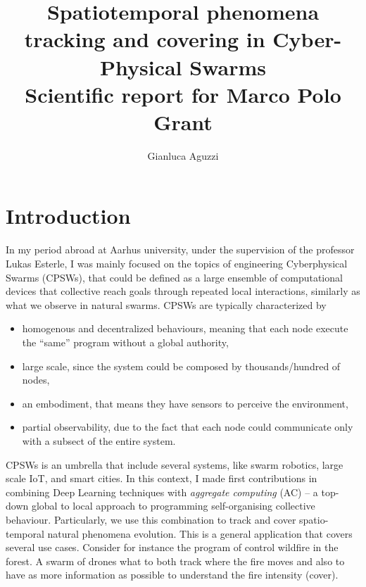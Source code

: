 \documentclass{article}
\title{
Spatiotemporal phenomena tracking and covering in Cyber-Physical Swarms \\[10pt]
\large Scientific report for Marco Polo Grant
}
\author{Gianluca Aguzzi
}
\begin{document}
\maketitle

\begin{abstract}

\end{abstract}

\section{Introduction}
In my period abroad at Aarhus university, under the supervision of the professor Lukas Esterle, 
 I was mainly focused on the topics of engineering Cyberphysical Swarms (CPSWs), that could be defined as a
 large ensemble of computational devices that collective reach goals through repeated local interactions, similarly as what we observe in natural swarms. 
CPSWs are typically characterized by 
\begin{itemize}
\item homogenous and decentralized behaviours, meaning that each node execute the ``same'' program without a global authority,
\item large scale, since the system could be composed by thousands/hundred of nodes, 
\item an embodiment, that means they have sensors to perceive the environment,
\item partial observability, due to the fact that each node could communicate only with a subsect of the entire system.
\end{itemize}
CPSWs is an umbrella that include several systems, like swarm robotics, large scale IoT, and smart cities.
%
In this context, I made first contributions in combining Deep Learning techniques with \textit{aggregate computing} (AC) 
 -- a top-down global to local approach to programming self-organising collective behaviour.
Particularly, we use this combination to track and cover spatio-temporal natural phenomena evolution. 
%
This is a general application that covers several use cases. 
 Consider for instance the program of control wildfire in the forest. 
 A swarm of drones what to both track where the fire moves and also to have as more information as possible to understand the fire intensity (cover).
%
 
\end{document}
